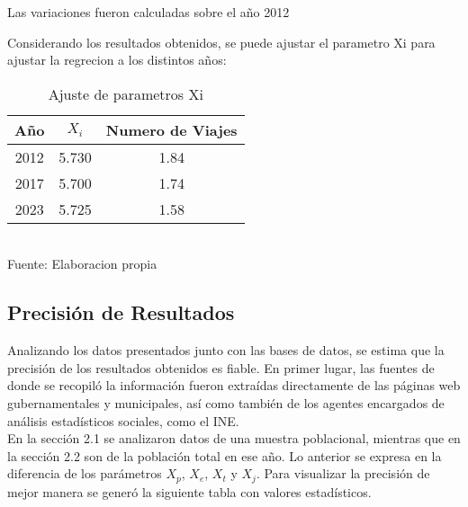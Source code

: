 \documentclass[12pt]{article} %
\begin{document}
Las variaciones fueron calculadas sobre el año 2012

Considerando los resultados obtenidos, se puede ajustar el parametro Xi para ajustar la regrecion a los distintos años:

\begin{table}[H]
    \centering
    \caption{Ajuste de parametros Xi}
    \vspace{0.2cm}
    \begin{tabular}{|c|c|c|}
        \hline
        Año & $X_i$ & Numero de Viajes \\
        \hline
        2012 & 5.730 & 1.84 \\
        2017 & 5.700 & 1.74 \\
        2023 & 5.725 & 1.58 \\
        \hline
    \end{tabular}
    \vspace{0.2cm}
    \\Fuente: Elaboracion propia
\end{table}


\subsection{Precisión de Resultados}
Analizando los datos presentados junto con las bases de datos, se estima que la precisión de los resultados obtenidos es fiable.
En primer lugar, las fuentes de donde se recopiló la información fueron extraídas directamente de las páginas web gubernamentales y municipales, 
así como también de los agentes encargados de análisis estadísticos sociales, como el INE.\\ 

En la sección 2.1 se analizaron datos de una muestra poblacional, mientras que en la sección 2.2 son de la población total en ese año.
Lo anterior se expresa en la diferencia de los parámetros $X_p$, $X_e$, $X_t$ y $X_j$. Para visualizar la precisión de mejor manera se generó la
siguiente tabla con valores estadísticos.\\
\end{document}
